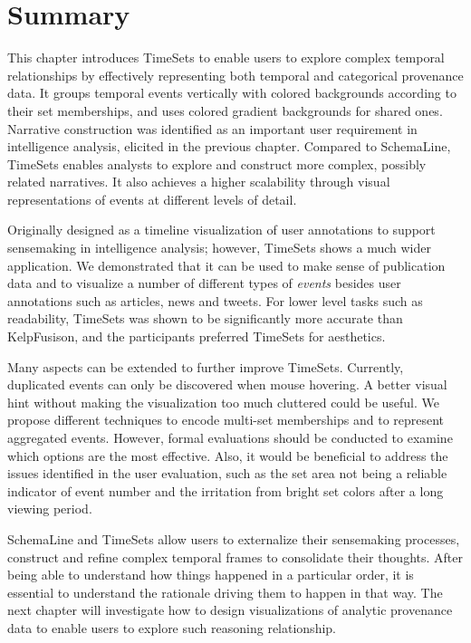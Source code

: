 \section{Summary}
This chapter introduces TimeSets to enable users to explore complex temporal relationships by effectively representing both temporal and categorical provenance data. It groups temporal events vertically with colored backgrounds according to their set memberships, and uses colored gradient backgrounds for shared ones. Narrative construction was identified as an important user requirement in intelligence analysis, elicited in the previous chapter. Compared to SchemaLine, TimeSets enables analysts to explore and construct more complex, possibly related narratives. It also achieves a higher scalability through visual representations of events at different levels of detail.

Originally designed as a timeline visualization of user annotations to support sensemaking in intelligence analysis; however, TimeSets shows a much wider application. We demonstrated that it can be used to make sense of publication data and to visualize a number of different types of \emph{events} besides user annotations such as articles, news and tweets. For lower level tasks such as readability, TimeSets was shown to be significantly more accurate than KelpFusison, and the participants preferred TimeSets for aesthetics.

Many aspects can be extended to further improve TimeSets. Currently, duplicated events can only be discovered when mouse hovering. A better visual hint without making the visualization too much cluttered could be useful. We propose different techniques to encode multi-set memberships and to represent aggregated events. However, formal evaluations should be conducted to examine which options are the most effective. Also, it would be beneficial to address the issues identified in the user evaluation, such as the set area not being a reliable indicator of event number and the irritation from bright set colors after a long viewing period.

SchemaLine and TimeSets allow users to externalize their sensemaking processes, construct and refine complex temporal frames to consolidate their thoughts. After being able to understand how things happened in a particular order, it is essential to understand the rationale driving them to happen in that way. The next chapter will investigate how to design visualizations of analytic provenance data to enable users to explore such reasoning relationship.